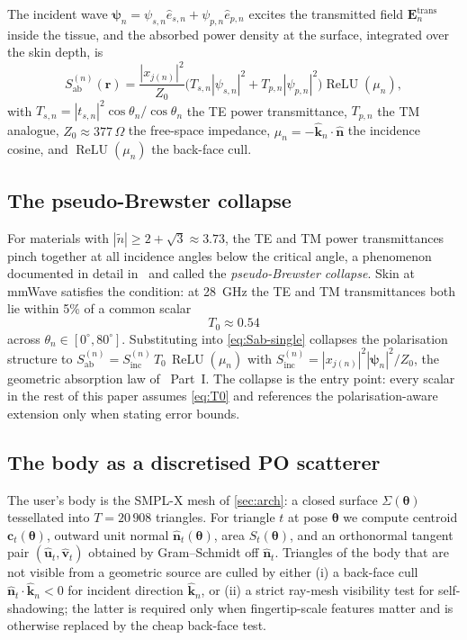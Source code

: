\documentclass[journal,twocolumn,10pt]{IEEEtran}
\theoremstyle{plain}
\theoremstyle{definition}
\theoremstyle{remark}
\newcommand{\nhat}{\hat{\bm{n}}}
\newcommand{\rr}{\mathbf{r}}
\newcommand{\EE}{\mathbf{E}}
\newcommand{\Sinc}{S_{\mathrm{inc}}}
\newcommand{\Sab}{S_{\mathrm{ab}}}
\newcommand{\psin}{\bm{\psi}_n}
\newcommand{\thetab}{\bm{\theta}}
\newcommand{\Tepskin}{T_{0}}
\newcommand{\ntilde}{\tilde{n}}
\DeclareMathOperator{\ReLU}{ReLU}
\begin{document}
The incident wave $\psin = \psi_{s,n}\hat{e}_{s,n} +
\psi_{p,n}\hat{e}_{p,n}$ excites the transmitted field
$\EE^{\mathrm{trans}}_n$ inside the tissue, and the absorbed power
density at the surface, integrated over the skin depth, is
\begin{equation}\label{eq:Sab-single}
\Sab^{(n)}(\rr) = \frac{|x_{j(n)}|^2}{Z_0}\bigl(T_{s,n}|\psi_{s,n}|^2
+ T_{p,n}|\psi_{p,n}|^2\bigr)\ReLU(\mu_n),
\end{equation}
with $T_{s,n} = |t_{s,n}|^2 \cos\theta_n / \cos\theta_n$ the TE
power transmittance, $T_{p,n}$ the TM analogue, $Z_0 \approx 377\,\Omega$
the free-space impedance, $\mu_n = -\hat{\bm{k}}_n\cdot\nhat$ the
incidence cosine, and $\ReLU(\mu_n)$ the back-face cull.

\subsection{The pseudo-Brewster collapse}

For materials with $|\ntilde| \geq 2 + \sqrt{3} \approx 3.73$, the
TE and TM power transmittances pinch together at all incidence
angles below the critical angle, a phenomenon documented in detail
in~\cite{WydaeghePB2024,WydaegheMonograph} and called the
\emph{pseudo-Brewster collapse}. Skin at mmWave satisfies the
condition: at 28~GHz the TE and TM transmittances both lie within
5\% of a common scalar
\begin{equation}\label{eq:T0}
\Tepskin \approx 0.54
\end{equation}
across $\theta_n \in [0^{\circ}, 80^{\circ}]$. Substituting into
\cref{eq:Sab-single} collapses the polarisation structure to
$\Sab^{(n)} = \Sinc^{(n)}\,\Tepskin\,\ReLU(\mu_n)$ with
$\Sinc^{(n)} = |x_{j(n)}|^2 |\psin|^2 / Z_0$, the geometric
absorption law of~\cite{WydaegheMonograph} Part~I. The collapse is
the entry point: every scalar in the rest of this paper assumes
\cref{eq:T0} and references the polarisation-aware extension only
when stating error bounds.

\subsection{The body as a discretised PO scatterer}

The user's body is the SMPL-X mesh of \cref{sec:arch}: a closed
surface $\Sigma(\thetab)$ tessellated into $T = 20\,908$ triangles.
For triangle $t$ at pose $\thetab$ we compute centroid
$\bm{c}_t(\thetab)$, outward unit normal $\nhat_t(\thetab)$, area
$S_t(\thetab)$, and an orthonormal tangent pair
$(\hat{\bm{u}}_t,\hat{\bm{v}}_t)$ obtained by Gram--Schmidt off
$\nhat_t$. Triangles of the body that are not visible from a
geometric source are culled by either (i) a back-face cull
$\nhat_t \cdot \hat{\bm{k}}_n < 0$ for incident direction
$\hat{\bm{k}}_n$, or (ii) a strict ray-mesh visibility test for
self-shadowing; the latter is required only when fingertip-scale
features matter and is otherwise replaced by the cheap back-face
test.
\end{document}
